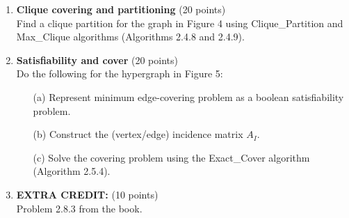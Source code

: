 \begin{enumerate}
\item {\bf Clique covering and partitioning} (20 points) \\ 
Find a clique partition for the graph in Figure 4 using 
Clique\_Partition and Max\_Clique algorithms (Algorithms 2.4.8 and 2.4.9).

\item {\bf Satisfiability and cover} (20 points) \\ 
Do the following for the hypergraph in Figure 5: 
\begin{itemize}
\item[(a)] Represent minimum edge-covering problem as a boolean satisfiability
           problem.
\item[(b)] Construct the (vertex/edge) incidence matrix $A_I$.
\item[(c)] Solve the covering problem using the Exact\_Cover
           algorithm (Algorithm 2.5.4).
\end{itemize}		

\item {\bf EXTRA CREDIT:} (10 points) \\ 
Problem 2.8.3 from the book.

\end{enumerate}
	


